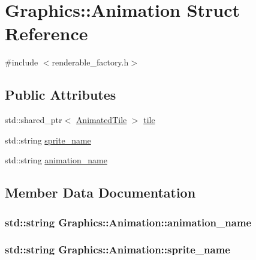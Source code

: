 \hypertarget{struct_graphics_1_1_animation}{}\section{Graphics\+:\+:Animation Struct Reference}
\label{struct_graphics_1_1_animation}


{\ttfamily \#include $<$renderable\+\_\+factory.\+h$>$}

\subsection*{Public Attributes}
\begin{DoxyCompactItemize}
\item 
std\+::shared\+\_\+ptr$<$ \hyperlink{class_graphics_1_1_animated_tile}{Animated\+Tile} $>$ \hyperlink{struct_graphics_1_1_animation_ac0f14390b964e2be6cc008d7f12e8f70}{tile}
\item 
std\+::string \hyperlink{struct_graphics_1_1_animation_af4ea267c0295aeaa58945bca4443c8ea}{sprite\+\_\+name}
\item 
std\+::string \hyperlink{struct_graphics_1_1_animation_a161abc31b182618b4c12f0eb3cf0034b}{animation\+\_\+name}
\end{DoxyCompactItemize}


\subsection{Member Data Documentation}
\hypertarget{struct_graphics_1_1_animation_a161abc31b182618b4c12f0eb3cf0034b}{}
\subsubsection[{animation\+\_\+name}]{\setlength{\rightskip}{0pt plus 5cm}std\+::string Graphics\+::\+Animation\+::animation\+\_\+name}\label{struct_graphics_1_1_animation_a161abc31b182618b4c12f0eb3cf0034b}
\hypertarget{struct_graphics_1_1_animation_af4ea267c0295aeaa58945bca4443c8ea}{}
\subsubsection[{sprite\+\_\+name}]{\setlength{\rightskip}{0pt plus 5cm}std\+::string Graphics\+::\+Animation\+::sprite\+\_\+name}\label{struct_graphics_1_1_animation_af4ea267c0295aeaa58945bca4443c8ea}
\hypertarget{struct_graphics_1_1_animation_ac0f14390b964e2be6cc008d7f12e8f70}{}
